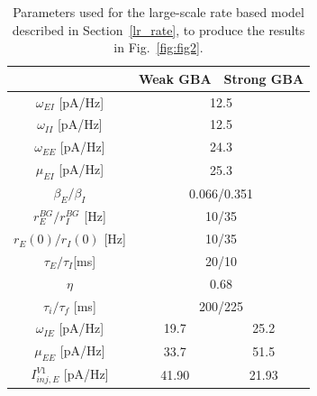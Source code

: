 \begin{table}[!hp]
\centering
\begin{tabular}{|c|cc|}
\hline
                             & \multicolumn{1}{c|}{\textbf{Weak GBA}} & \textbf{Strong GBA} \\ \hline
$\omega_{EI}$ {[}pA/Hz{]}    & \multicolumn{2}{c|}{12.5}                                    \\ \hline
$\omega_{II}$ {[}pA/Hz{]}    & \multicolumn{2}{c|}{12.5}                                    \\ \hline
$\omega_{EE}$ {[}pA/Hz{]}    & \multicolumn{2}{c|}{24.3}                                    \\ \hline
$\mu_{EI}$ {[}pA/Hz{]}       & \multicolumn{2}{c|}{25.3}                                    \\ \hline
$\beta_E/\beta_I$            & \multicolumn{2}{c|}{0.066/0.351}                             \\ \hline
$r_E^{BG}/r_I^{BG}$ {[}Hz{]} & \multicolumn{2}{c|}{10/35}                             \\ \hline
$r_E(0)/r_I(0)$ {[}Hz{]}     & \multicolumn{2}{c|}{10/35}                                   \\ \hline
$\tau_E/\tau_I${[}ms{]}      & \multicolumn{2}{c|}{20/10}                                   \\ \hline
$\eta$                       & \multicolumn{2}{c|}{0.68}                                    \\ \hline
$\tau_i/\tau_f$ {[}ms{]}     & \multicolumn{2}{c|}{200/225}                                 \\ \hline
$\omega_{IE}$ {[}pA/Hz{]}    & \multicolumn{1}{c|}{19.7}              & 25.2                \\ \hline
$\mu_{EE}$ {[}pA/Hz{]}       & \multicolumn{1}{c|}{33.7}              & 51.5                \\ \hline
$I_{inj,E}^{V1}$ {[}pA/Hz{]} & \multicolumn{1}{c|}{41.90}             & 21.93               \\ \hline
\end{tabular}
\caption{Parameters used for the large-scale rate based model described in Section~\ref{lr_rate}, to produce the results in Fig.~\ref{fig:fig2}. }\label{tab:tab2}
\end{table}

